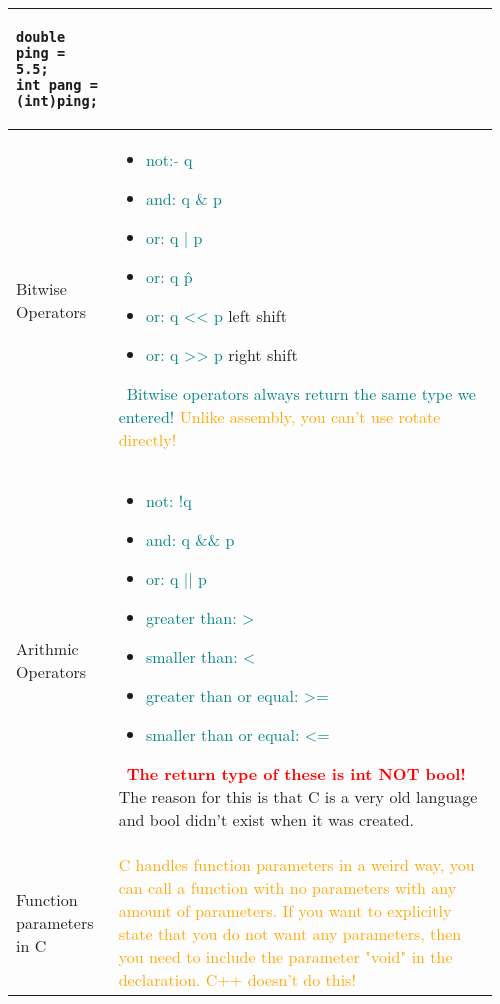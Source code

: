 \documentclass[main.tex,fontsize=8pt,paper=a4,paper=portrait,DIV=calc,]{scrartcl}
\begin{document}
\begin{table}[ht!]
\begin{tabular}{|m{0.2\linewidth}|m{0.755\linewidth}|}
\begin{lstlisting}
double ping = 5.5;
int pang = (int)ping;
\end{lstlisting}\\
\hline
Bitwise Operators & 
\vspace{2mm}
\begin{itemize}
  \item \textcolor{teal}{not: \(\tilde{} \) q}
  \item \textcolor{teal}{and: q \& p }
  \item \textcolor{teal}{or: q | p}
  \item \textcolor{teal}{or: q \^ p}
  \item \textcolor{teal}{or: q << p} left shift
  \item \textcolor{teal}{or: q >> p} right shift
\end{itemize}
\, \newline
\textcolor{teal}{Bitwise operators always return the same type we entered!}\newline 
\textcolor{orange}{Unlike assembly, you can't use rotate directly!} \\
\hline
Arithmic Operators& 
\vspace{2mm}
\begin{itemize}
  \item \textcolor{teal}{not: !q}
  \item \textcolor{teal}{and: q \&\& p}
  \item \textcolor{teal}{or: q || p}
  \item \textcolor{teal}{greater than: >}
  \item \textcolor{teal}{smaller than: <}
  \item \textcolor{teal}{greater than or equal: >=}
  \item \textcolor{teal}{smaller than or equal: <=}
\end{itemize}
\, \newline
\textcolor{red}{\textbf{The return type of these is int NOT bool!}}\newline
The reason for this is that C is a very old language and bool didn't exist when it was created.\\
\hline
Function parameters in C &
\textcolor{orange}{C handles function parameters in a weird way, you can call a function with no parameters with any amount of parameters. If you want to explicitly state that you do not want any parameters, then you need to include the parameter "void" in the declaration. C++ doesn't do this!}\newline

\end{tabular}
\end{table}
\end{document}
